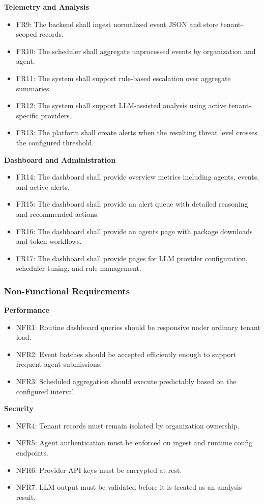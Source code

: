 \documentclass[12pt,a4paper]{article}
\begin{document}
\textbf{Telemetry and Analysis}
\begin{itemize}
    \item FR9: The backend shall ingest normalized event JSON and store tenant-scoped records.
    \item FR10: The scheduler shall aggregate unprocessed events by organization and agent.
    \item FR11: The system shall support rule-based escalation over aggregate summaries.
    \item FR12: The system shall support LLM-assisted analysis using active tenant-specific providers.
    \item FR13: The platform shall create alerts when the resulting threat level crosses the configured threshold.
\end{itemize}

\textbf{Dashboard and Administration}
\begin{itemize}
    \item FR14: The dashboard shall provide overview metrics including agents, events, and active alerts.
    \item FR15: The dashboard shall provide an alert queue with detailed reasoning and recommended actions.
    \item FR16: The dashboard shall provide an agents page with package downloads and token workflows.
    \item FR17: The dashboard shall provide pages for LLM provider configuration, scheduler tuning, and rule management.
\end{itemize}

\subsubsection{Non-Functional Requirements}
\textbf{Performance}
\begin{itemize}
    \item NFR1: Routine dashboard queries should be responsive under ordinary tenant load.
    \item NFR2: Event batches should be accepted efficiently enough to support frequent agent submissions.
    \item NFR3: Scheduled aggregation should execute predictably based on the configured interval.
\end{itemize}

\textbf{Security}
\begin{itemize}
    \item NFR4: Tenant records must remain isolated by organization ownership.
    \item NFR5: Agent authentication must be enforced on ingest and runtime config endpoints.
    \item NFR6: Provider API keys must be encrypted at rest.
    \item NFR7: LLM output must be validated before it is treated as an analysis result.
\end{itemize}
\end{document}
